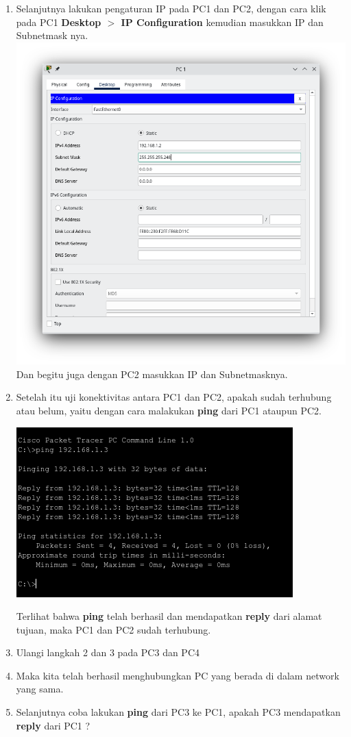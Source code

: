 \documentclass{article}
\begin{document}
\begin{flushleft}
\begin{enumerate}
            \item Selanjutnya lakukan pengaturan IP pada PC1 dan PC2, dengan cara klik pada PC1 \textbf{Desktop $>$ IP Configuration} kemudian masukkan IP dan Subnetmask nya.
            \includegraphics[scale=0.5]{2-pc1.png}
            Dan begitu juga dengan PC2 masukkan IP dan Subnetmasknya.

            \item Setelah itu uji konektivitas antara PC1 dan PC2, apakah sudah terhubung atau belum, yaitu dengan cara malakukan \textbf{ping} dari PC1 ataupun PC2.

            \includegraphics[scale=0.75]{2-ping-12.png}

            Terlihat bahwa \textbf{ping} telah berhasil dan mendapatkan \textbf{reply} dari alamat tujuan, maka PC1 dan PC2 sudah terhubung.

            \item Ulangi langkah 2 dan 3 pada PC3 dan PC4
            \item Maka kita telah berhasil menghubungkan PC yang berada di dalam network yang sama.
            \item Selanjutnya coba lakukan \textbf{ping} dari PC3 ke PC1, apakah PC3 mendapatkan \textbf{reply} dari PC1 ?
        \end{enumerate}
    \end{flushleft}
\end{document}
